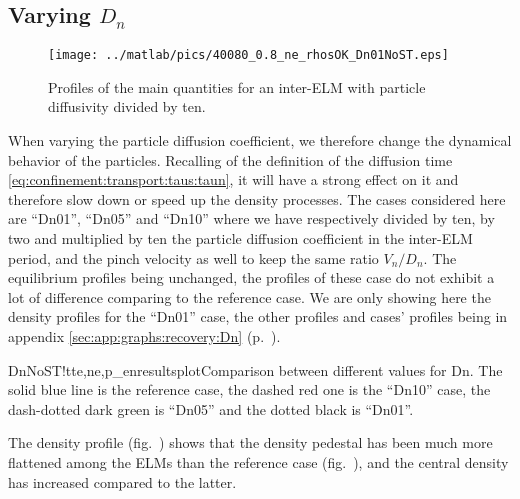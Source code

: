 \subsection{Varying $D_n$}\label{sec:results:ELMs:recover:Dn}
\begin{figure}[!b]
\begin{center}
\texttt{[image: ../matlab/pics/40080\_0.8\_ne\_rhosOK\_Dn01NoST.eps]}
\vspace{-7mm}
\end{center}
\caption{\footnotesize Profiles of the main quantities for an inter-ELM with particle diffusivity divided by ten.\label{fig:results:ELMs:rhosOK:Dn01NoST:ne}}
\end{figure}
When varying the particle diffusion coefficient, we therefore change the dynamical behavior of the particles. Recalling of the definition of the diffusion time \eqref{eq:confinement:transport:taus:taun}, it will have a strong effect on it and therefore slow down or speed up the density processes. The cases considered here are ``Dn01'', ``Dn05'' and ``Dn10'' where we have respectively divided by ten, by two and multiplied by ten the particle diffusion coefficient in the inter-ELM period, and the pinch velocity as well to keep the same ratio $V_n / D_n$. The equilibrium profiles being unchanged, the profiles of these case do not exhibit a lot of difference comparing to the reference case. We are only showing here the density profiles for the ``Dn01'' case, the other profiles and cases' profiles being in appendix \ref{sec:app:graphs:recovery:Dn} (p.~\pageref{sec:app:graphs:recovery:Dn}).

\begin{AllFigs}{DnNoST}{!t}{}{te,ne,p_e}{n}{resultsplot}{Comparison between different values for Dn. The solid blue line is the reference case, the dashed red one is the ``Dn10'' case, the dash-dotted dark green is ``Dn05'' and the dotted black is ``Dn01''.}
\end{AllFigs}
The density profile (fig.~) shows that the density pedestal has been much more flattened among the ELMs than the reference case (fig.~), and the central density has increased compared to the latter.%

